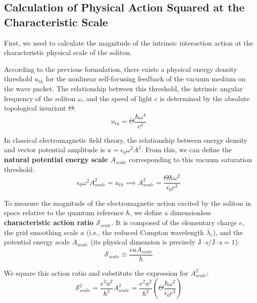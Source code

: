\documentclass[12pt, a4paper]{article}
\begin{document}
\subsection{Calculation of Physical Action Squared at the Characteristic Scale}

First, we need to calculate the magnitude of the intrinsic interaction action at the characteristic physical scale of the soliton.

According to the previous formulation, there exists a physical energy density threshold $u_{th}$ for the nonlinear self-focusing feedback of the vacuum medium on the wave packet. The relationship between this threshold, the intrinsic angular frequency of the soliton $\omega$, and the speed of light $c$ is determined by the absolute topological invariant $\Theta$:
\begin{equation}
u_{th} = \Theta \frac{\hbar \omega^4}{c^3}
\end{equation}

In classical electromagnetic field theory, the relationship between energy density and vector potential amplitude is $u = \epsilon_0 \omega^2 A^2$. From this, we can define the \textbf{natural potential energy scale $A_{scale}$} corresponding to this vacuum saturation threshold:
\begin{equation}
\epsilon_0 \omega^2 A_{scale}^2 = u_{th} \implies A_{scale}^2 = \frac{\Theta \hbar \omega^2}{\epsilon_0 c^3}
\end{equation}

To measure the magnitude of the electromagnetic action excited by the soliton in space relative to the quantum reference $\hbar$, we define a dimensionless \textbf{characteristic action ratio $\mathcal{S}_{scale}$}. It is composed of the elementary charge $e$, the grid smoothing scale $a$ (i.e., the reduced Compton wavelength $\bar{\lambda}_c$), and the potential energy scale $A_{scale}$ (its physical dimension is precisely $\text{J}\cdot\text{s}/\text{J}\cdot\text{s} = 1$):
\begin{equation}
\mathcal{S}_{scale} \equiv \frac{e a A_{scale}}{\hbar}
\end{equation}

We square this action ratio and substitute the expression for $A_{scale}^2$:
\begin{equation}
\mathcal{S}_{scale}^2 = \frac{e^2 a^2}{\hbar^2} A_{scale}^2 = \frac{e^2 a^2}{\hbar^2} \left( \Theta \frac{\hbar \omega^2}{\epsilon_0 c^3} \right)
\end{equation}
\end{document}
